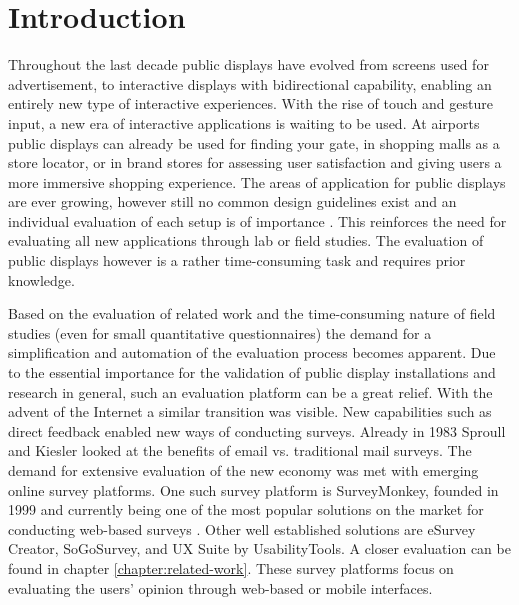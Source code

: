 \section{Introduction}
\label{sec:introduction}

	Throughout the last decade public displays have evolved from screens used for advertisement, to interactive displays with bidirectional capability, enabling an entirely new type of interactive experiences. With the rise of touch and gesture input, a new era of interactive applications is waiting to be used. At airports public displays can already be used for finding your gate, in shopping malls as a store locator, or in brand stores for assessing user satisfaction and giving users a more immersive shopping experience. The areas of application for public displays are ever growing, however still no common design guidelines exist \cite{Alt2012HowToEvaluate} and an individual evaluation of each setup is of importance \cite{muller2010requirements}. This reinforces the need for evaluating all new applications through lab or field studies. The evaluation of public displays however is a rather time-consuming task and requires prior knowledge. 


	Based on the evaluation of related work and the time-consuming nature of field studies (even for small quantitative questionnaires) the demand for a simplification and automation of the evaluation process becomes apparent. Due to the essential importance for the validation of public display installations and research in general, such an evaluation platform can be a great relief. 
	With the advent of the Internet a similar transition was visible. 
	New capabilities such as direct feedback enabled new ways of conducting surveys. Already in 1983 Sproull and Kiesler \cite{sproull1986reducing} looked at the benefits of email vs. traditional mail surveys. The demand for extensive evaluation of the new economy was met with emerging online survey platforms. One such survey platform is SurveyMonkey, founded in 1999 and currently being one of the most popular solutions on the market for conducting web-based surveys \cite{SurveyMonkeyAboutUs}. Other well established solutions are eSurvey Creator, SoGoSurvey, and UX Suite by UsabilityTools. A closer evaluation can be found in chapter \ref{chapter:related-work}. These survey platforms focus on evaluating the users' opinion through web-based or mobile interfaces. 


